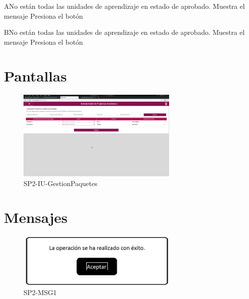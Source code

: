 \label{SP2-CU5-A}
\begin{UCtrayectoriaA}{A}{No están todas las unidades de aprendizaje en estado de aprobado.}
    \UCpaso Muestra el mensaje 
    \UCpaso[\UCactor] Presiona el botón 
\end{UCtrayectoriaA}


\label{SP2-CU5-B}
\begin{UCtrayectoriaA}{B}{No están todas las unidades de aprendizaje en estado de aprobado.}
    \UCpaso Muestra el mensaje 
    \UCpaso[\UCactor] Presiona el botón 
\end{UCtrayectoriaA}


\chapter{Pantallas}
 \begin{figure}
  \centering
    \includegraphics[width=0.7\textwidth]{DCU/SP2/Pantallas/GestionPaquetes}
  \caption{SP2-IU-GestionPaquetes}
  \label{SP2-IU-GestionPaquetes}
\end{figure}

\chapter{Mensajes}
 \begin{figure}
  \centering
    \includegraphics[width=0.7\textwidth]{DCU/SP2/mensajes/MSG1}
   \caption{SP2-MSG1}
  \label{SP2-MSG1}
\end{figure}

